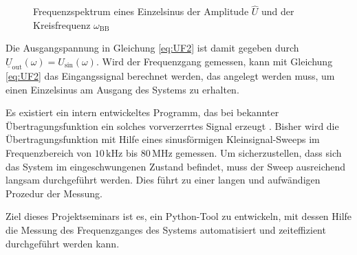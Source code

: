 \documentclass[12pt,report,final,twoside,accentcolor=tud9b,bigchapter]{tudreport}
\newcommand{\Usin}{U_\mathrm{sin}}
\begin{document}
\begin{figure}[htb]
\centering
{}
      \caption{Frequenzspektrum eines Einzelsinus der Amplitude $\widehat{U}$ und der Kreisfrequenz $\omega_{\mathrm{BB}}$ \citep{Harzheim2017}}
      \label{fig:SpektrumSinus}
\end{figure}

Die Ausgangspannung in Gleichung \ref{eq:UF2} ist damit gegeben durch $\underline{U}_\mathrm{out}(\omega)=\Usin(\omega)$. Wird der Frequenzgang gemessen, kann mit Gleichung \ref{eq:UF2} das Eingangssignal berechnet werden, das angelegt werden muss, um einen Einzelsinus am Ausgang des Systems zu erhalten. \cite{Frey2015, Harzheim2017}


Es existiert ein intern entwickeltes Programm, das bei bekannter Übertragungsfunktion ein solches vorverzerrtes Signal erzeugt \cite{Gross2013}. Bisher wird die Übertragungsfunktion mit Hilfe eines sinusförmigen Kleinsignal-Sweeps im Frequenzbereich von $10\, \mathrm{kHz}$ bis $80\, \mathrm{MHz}$ gemessen. Um sicherzustellen, dass sich das System im eingeschwungenen Zustand befindet, muss der Sweep ausreichend langsam durchgeführt werden. Dies führt zu einer langen und aufwändigen Prozedur der Messung. \cite{Frey2015}

Ziel dieses Projektseminars ist es, ein Python-Tool zu entwickeln, mit dessen Hilfe die Messung des Frequenzganges des Systems automatisiert und zeiteffizient durchgeführt werden kann. 
\end{document}
